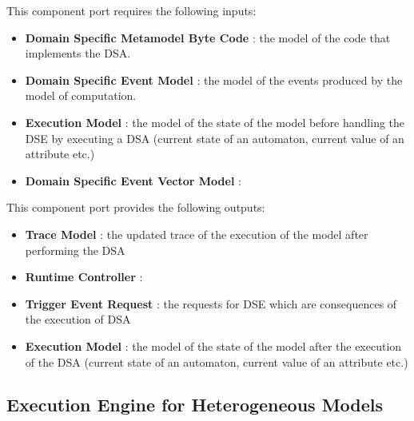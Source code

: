 \documentclass{gemoc} %
\begin{document}
This component port requires the following inputs:
\begin{itemize}
  \item \textbf{Domain Specific Metamodel Byte Code} :
the model of the code that implements the DSA.
  \item \textbf{Domain Specific Event Model} :
the model of the events produced by the model of computation.
  \item \textbf{Execution Model} :
the model of the state of the model before handling the DSE by executing a DSA (current state of an automaton, current value of an attribute etc.)
  \item \textbf{Domain Specific Event Vector Model} :
\end{itemize}

This component port provides the following outputs:
\begin{itemize}
  \item \textbf{Trace Model} :
the updated trace of the execution of the model after performing the DSA
  \item \textbf{Runtime Controller} :
  \item \textbf{Trigger Event Request} :
the requests for DSE which are consequences of the execution of DSA
  \item \textbf{Execution Model} :
the model of the state of the model after the execution of the DSA (current state of an automaton, current value of an attribute etc.)
\end{itemize}

\subsection{Execution Engine for Heterogeneous Models}
\end{document}
